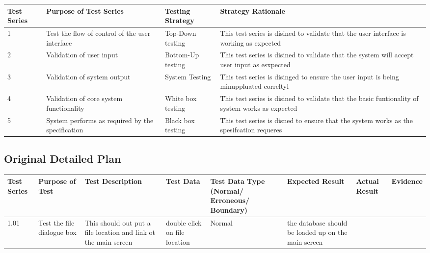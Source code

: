 \begin{landscape}
\begin{center}
    \begin{tabular}{|p{2cm}|p{5cm}|p{5cm}|p{4cm}|}
        \hline
        \textbf{Test Series} & \textbf{Purpose of Test Series} & \textbf{Testing Strategy} & \textbf{Strategy Rationale}\\ \hline

        \rowcolor{Grey} 1 & Test the flow of control of the user interface  & Top-Down testing & This test series is disined to validate that the user interface is working as expected\\ \hline

       \rowcolor{Grey} 2 & Validation of user input & Bottom-Up testing & This test series is disined to validate that the system will accept user input as esxpected \\ \hline

       \rowcolor{Grey} 3 & Validation of system output & System Testing & This test series is disinged to ensure the user input is being minuppluated correltyl  \\ \hline

       \rowcolor{Grey} 4 & Validation of core system functionality & White box testing & This test series is disined to validate that the basic funtionality of system works as expected \\ \hline

       \rowcolor{Grey} 5 & System performs as required by the specification & Black box testing & This test series is disned to ensure that the system works as the spesifcation requeres\\ \hline
    \end{tabular}
\end{center}
\subsection{Original Detailed Plan}

\begin{center}
    \begin{longtable}{|p{1.5cm}|p{2.5cm}|p{2.5cm}|p{2cm}|p{2cm}|p{2cm}|p{2cm}|p{2cm}|}
        \hline
        \textbf{Test Series} & \textbf{Purpose of Test} & \textbf{Test Description} & \textbf{Test Data} & \textbf{Test Data Type (Normal/ Erroneous/ Boundary)} & \textbf{Expected Result} & \textbf{Actual Result} & \textbf{Evidence}\\ \hline
        1.01 & Test the file dialogue box & This should out put a file location and link ot the main screen & double click on file location & Normal & the database should be loaded up on the main screen &  &  \\ \hline
        

\end{longtable}
\end{center}
\end{landscape}
